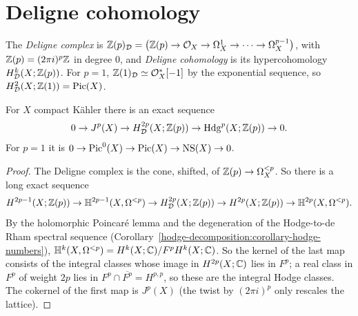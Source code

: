 \section{Deligne cohomology}\label{intermediate-jacobians:section-deligne-cohomology}

\begin{definition}\label{intermediate-jacobians:definition-deligne-complex}
The \emph{Deligne complex} is $\mathbb{Z}(p)_{\mathcal{D}} = \big(\mathbb{Z}(p) \to \mathcal{O}_X \to \Omega^1_X \to \cdots \to \Omega^{p-1}_X\big)$, with $\mathbb{Z}(p) = (2\pi i)^p\mathbb{Z}$ in degree $0$, and \emph{Deligne cohomology}
is its hypercohomology $H^k_{\mathcal{D}}(X; \mathbb{Z}(p))$. For $p = 1$, $\mathbb{Z}(1)_{\mathcal{D}} \simeq \mathcal{O}_X^*[-1]$ by the exponential sequence, so $H^2_{\mathcal{D}}(X; \mathbb{Z}(1)) = \operatorname{Pic}(X)$.
\end{definition}

\begin{proposition}\label{intermediate-jacobians:proposition-deligne-sequence}
For $X$ compact K\"ahler there is an exact sequence
\[
0 \to J^p(X) \to H^{2p}_{\mathcal{D}}(X; \mathbb{Z}(p)) \to \mathrm{Hdg}^p(X; \mathbb{Z}(p)) \to 0 .
\]
For $p = 1$ it is $0 \to \operatorname{Pic}^0(X) \to \operatorname{Pic}(X) \to \mathrm{NS}(X) \to 0$.
\end{proposition}

\begin{proof}
The Deligne complex is the cone, shifted, of $\mathbb{Z}(p) \to \Omega^{<p}_X$. So there is a long exact sequence
\[
H^{2p-1}(X; \mathbb{Z}(p)) \to \mathbb{H}^{2p-1}(X, \Omega^{<p}) \to H^{2p}_{\mathcal{D}}(X; \mathbb{Z}(p)) \to H^{2p}(X; \mathbb{Z}(p)) \to \mathbb{H}^{2p}(X, \Omega^{<p}) .
\]
By the holomorphic Poincar\'e lemma and the degeneration of the Hodge-to-de Rham spectral sequence (Corollary~\ref{hodge-decomposition:corollary-hodge-numbers}),
$\mathbb{H}^k(X, \Omega^{<p}) = H^k(X; \mathbb{C})/F^pH^k(X; \mathbb{C})$. So the kernel of the last map consists of the integral classes whose image in $H^{2p}(X; \mathbb{C})$ lies in $F^p$; a real class in $F^p$ of
weight $2p$ lies in $F^p \cap \overline{F^p} = H^{p,p}$, so these are the integral Hodge classes. The cokernel of the first map is $J^p(X)$ (the twist by $(2\pi i)^p$ only rescales the lattice).
\end{proof}

